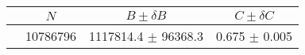 \begin{tabular}{lccc}
\hline
    &   $N$   & $B \pm \delta B$  &  $C \pm \delta C$ \\
\hline
                               & 10786796   & 1117814.4  $\pm$ 96368.3 & 0.675      $\pm$ 0.005 \\
\hline
\end{tabular}
